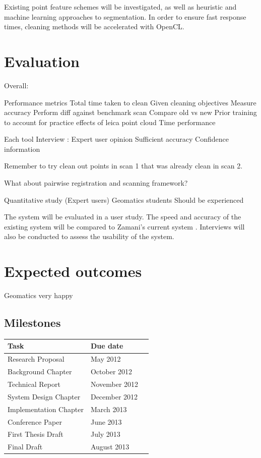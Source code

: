 \documentclass[10pt,twocolumn]{article}
\begin{document}
Existing point feature schemes will be investigated, as well as heuristic and machine learning approaches to segmentation. In order to ensure fast response times, cleaning methods will be accelerated with OpenCL.

\section{Evaluation}

Overall:

Performance metrics
	Total time taken to clean
		Given cleaning objectives
		Measure accuracy
			Perform diff against benchmark scan
		Compare old vs new
		Prior training to account for practice effects of leica point cloud
	Time performance
		
Each tool
	Interview : Expert user opinion
		Sufficient accuracy
		Confidence information
			
Remember to try clean out points in scan 1 that was already clean in scan 2.

What about pairwise registration and scanning framework?


Quantitative study (Expert users)
	Geomatics students
	Should be experienced

The system will be evaluated in a user study. The speed and accuracy of the existing system will be compared to Zamani's current system \cite{Leica2012}. Interviews will also be conducted to assess the usability of the system.

\section{Expected outcomes}
Geomatics very happy

\subsection{Milestones}
\begin{tabular}{llr}
\hline
Task & Due date \\
\hline
Research Proposal & May 2012\\
Background Chapter & October 2012\\
Technical Report & November 2012\\
System Design Chapter & December 2012\\
Implementation Chapter & March 2013\\
Conference Paper & June 2013\\
First Thesis Draft & July 2013\\
Final Draft & August 2013\\
\hline
\end{tabular}
\end{document}
